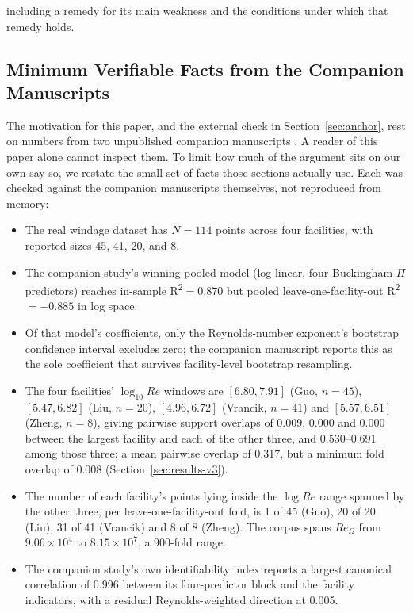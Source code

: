 \documentclass[journal=dce]{CUP-JNL-DTM}%
\begin{document}
including a remedy for its main weakness and the conditions under which that remedy holds.

\begin{appendix}
\section{Minimum Verifiable Facts from the Companion Manuscripts}
\label{app:companion}

The motivation for this paper, and the external check in Section~\ref{sec:anchor}, rest on numbers from two unpublished companion manuscripts \citep{gilruiz2026paper1,gilruiz2026paper2}. A reader of this paper alone cannot inspect them. To limit how much of the argument sits on our own say-so, we restate the small set of facts those sections actually use. Each was checked against the companion manuscripts themselves, not reproduced from memory:

\begin{itemize}
  \item The real windage dataset has $N=114$ points across four facilities, with reported sizes 45, 41, 20, and 8.
  \item The companion study's winning pooled model (log-linear, four Buckingham-$\Pi$ predictors) reaches in-sample R\textsuperscript{2}$=0.870$ but pooled leave-one-facility-out R\textsuperscript{2}$=-0.885$ in log space.
  \item Of that model's coefficients, only the Reynolds-number exponent's bootstrap confidence interval excludes zero; the companion manuscript reports this as the sole coefficient that survives facility-level bootstrap resampling.
  \item The four facilities' $\log_{10} Re$ windows are $[6.80, 7.91]$ (Guo, $n{=}45$), $[5.47, 6.82]$ (Liu, $n{=}20$), $[4.96, 6.72]$ (Vrancik, $n{=}41$) and $[5.57, 6.51]$ (Zheng, $n{=}8$), giving pairwise support overlaps of 0.009, 0.000 and 0.000 between the largest facility and each of the other three, and 0.530--0.691 among those three: a mean pairwise overlap of 0.317, but a minimum fold overlap of 0.008 (Section~\ref{sec:results-v3}).
  \item The number of each facility's points lying inside the $\log Re$ range spanned by the other three, per leave-one-facility-out fold, is 1 of 45 (Guo), 20 of 20 (Liu), 31 of 41 (Vrancik) and 8 of 8 (Zheng). The corpus spans $Re_\Omega$ from $9.06\times10^{4}$ to $8.15\times10^{7}$, a 900-fold range.
  \item The companion study's own identifiability index reports a largest canonical correlation of 0.996 between its four-predictor block and the facility indicators, with a residual Reynolds-weighted direction at 0.005.
\end{itemize}


\end{appendix}
\end{document}
